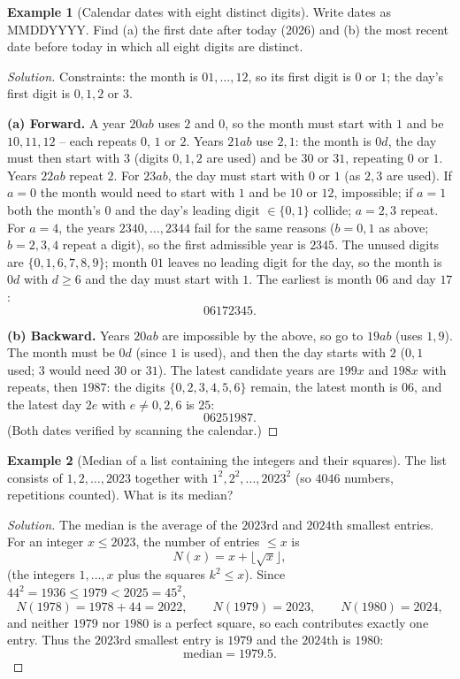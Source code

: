 \documentclass[11pt]{article}
\theoremstyle{definition}
\newtheorem{example}{Example}[section]
\begin{document}
\begin{example}[Calendar dates with eight distinct digits]
Write dates as MMDDYYYY. Find (a) the first date after today (2026) and (b) the most recent date before today in which all eight digits are distinct.
\end{example}

\begin{proof}[Solution]
Constraints: the month is $01,\dots,12$, so its first digit is $0$ or $1$; the day's first digit is $0,1,2$ or $3$.

\textbf{(a) Forward.} A year $20ab$ uses $2$ and $0$, so the month must start with $1$ and be $10,11,12$ -- each repeats $0$, $1$ or $2$. Years $21ab$ use $2,1$: the month is $0d$, the day must then start with $3$ (digits $0,1,2$ are used) and be $30$ or $31$, repeating $0$ or $1$. Years $22ab$ repeat $2$. For $23ab$, the day must start with $0$ or $1$ (as $2,3$ are used). If $a=0$ the month would need to start with $1$ and be $10$ or $12$, impossible; if $a=1$ both the month's $0$ and the day's leading digit $\in\{0,1\}$ collide; $a=2,3$ repeat. For $a=4$, the years $2340,\dots,2344$ fail for the same reasons ($b=0,1$ as above; $b=2,3,4$ repeat a digit), so the first admissible year is $2345$. The unused digits are $\{0,1,6,7,8,9\}$; month $01$ leaves no leading digit for the day, so the month is $0d$ with $d\ge6$ and the day must start with $1$. The earliest is month $06$ and day $17$:
\[
\boxed{06172345}.
\]

\textbf{(b) Backward.} Years $20ab$ are impossible by the above, so go to $19ab$ (uses $1,9$). The month must be $0d$ (since $1$ is used), and then the day starts with $2$ ($0,1$ used; $3$ would need $30$ or $31$). The latest candidate years are $199x$ and $198x$ with repeats, then $1987$: the digits $\{0,2,3,4,5,6\}$ remain, the latest month is $06$, and the latest day $2e$ with $e\ne 0,2,6$ is $25$:
\[
\boxed{06251987}.
\]
(Both dates verified by scanning the calendar.)
\end{proof}

\begin{example}[Median of a list containing the integers and their squares]
The list consists of $1,2,\dots,2023$ together with $1^2,2^2,\dots,2023^2$ (so $4046$ numbers, repetitions counted). What is its median?
\end{example}

\begin{proof}[Solution]
The median is the average of the $2023$rd and $2024$th smallest entries. For an integer $x\le2023$, the number of entries $\le x$ is
\[
N(x)=x+\lfloor\sqrt x\rfloor,
\]
(the integers $1,\dots,x$ plus the squares $k^2\le x$). Since $44^2=1936\le1979<2025=45^2$,
\[
N(1978)=1978+44=2022,\qquad N(1979)=2023,\qquad N(1980)=2024,
\]
and neither $1979$ nor $1980$ is a perfect square, so each contributes exactly one entry. Thus the $2023$rd smallest entry is $1979$ and the $2024$th is $1980$:
\[
\boxed{\text{median}=1979.5}.
\]
\end{proof}
\end{document}
